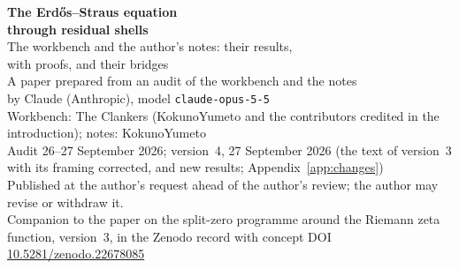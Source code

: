 


\thispagestyle{plain}
\begin{center}
{\LARGE\bfseries The Erdős--Straus equation\\[2pt] through residual shells}\\[8pt]
{\Large The workbench and the author's notes: their results,\\ with proofs, and their bridges}\\[14pt]
{\large A paper prepared from an audit of the workbench and the notes\\ by Claude (Anthropic), model \texttt{claude-opus-5-5}}\\[8pt]
{\normalsize Workbench: The Clankers (KokunoYumeto and the contributors credited in the introduction); notes: KokunoYumeto}\\[4pt]
{\normalsize Audit 26--27 September 2026; version~4, 27 September 2026 (the text of version~3 with its framing corrected, and new results; Appendix~\ref{app:changes})}\\[4pt]
{\small Published at the author's request ahead of the author's review; the author may revise or withdraw it.}\\[2pt]
{\small Companion to the paper on the split-zero programme around the Riemann zeta function, version~3, in the Zenodo record with concept DOI \href{https://doi.org/10.5281/zenodo.22678085}{10.5281/zenodo.22678085}}
\end{center}



\tableofcontents
\clearpage










\appendix





